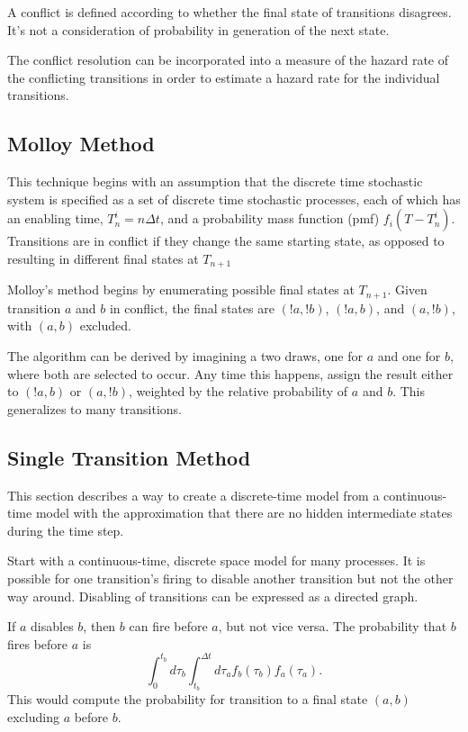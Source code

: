 \documentclass{article}
\begin{document}
A conflict is defined according to whether the
final state of transitions disagrees. It's not a consideration
of probability in generation of the next state.

The conflict resolution can be incorporated into 
a measure of the hazard rate of the conflicting transitions
in order to estimate a hazard rate for the individual transitions.



\subsection{Molloy Method}
This technique begins with an assumption that
the discrete time stochastic system is specified as a
set of discrete time stochastic processes, each of which
has an enabling time, $T^i_n=n\Delta t$, and a probability
mass function (pmf) $f_i(T-T^i_n)$. Transitions are in
conflict if they change the same starting state, as opposed
to resulting in different final states at $T_{n+1}$

Molloy's method begins by enumerating possible final
states at $T_{n+1}$. Given transition $a$ and $b$ in conflict,
the final states are $(!a,!b)$, $(!a,b)$, and $(a,!b)$,
with $(a,b)$ excluded.

The algorithm can be derived by imagining a two draws, one
for $a$ and one for $b$, where both are selected to occur.
Any time this happens, assign the result either to
$(!a,b)$ or $(a,!b)$, weighted by the relative probability
of $a$ and $b$. This generalizes to many transitions.


\subsection{Single Transition Method}
This section describes a way to create a discrete-time
model from a continuous-time model with the approximation
that there are no hidden intermediate states during the
time step.

Start with a continuous-time, discrete space model
for many processes.
It is possible for one transition's firing to disable
another transition but not the other way around.
Disabling of transitions can be expressed as a directed
graph.

If $a$ disables $b$, then $b$ can fire before $a$, but not
vice versa. The probability that $b$ fires before $a$ is
\begin{equation}
  \int_0^{t_b}d\tau_b\int_{t_b}^{\Delta t}d\tau_a
  f_b(\tau_b)f_a(\tau_a).
\end{equation}
This would compute the probability for transition to
a final state $(a,b)$ excluding $a$ before $b$.
\end{document}
